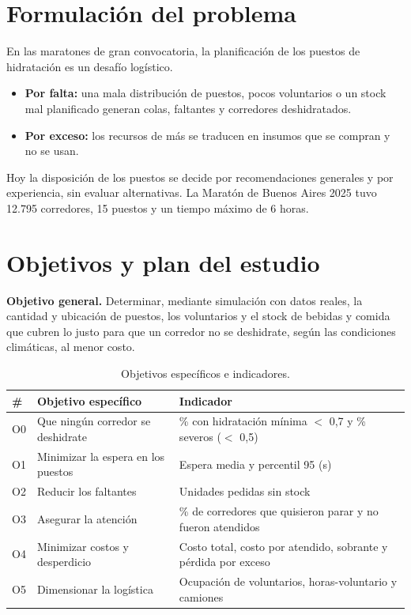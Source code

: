 \documentclass[11pt,a4paper]{article}
\begin{document}
\tableofcontents
\newpage

\section{Formulación del problema}

En las maratones de gran convocatoria, la planificación de los puestos de hidratación es un desafío logístico.
\begin{itemize}
    \item \textbf{Por falta:} una mala distribución de puestos, pocos voluntarios o un stock mal planificado generan colas, faltantes y corredores deshidratados.
    \item \textbf{Por exceso:} los recursos de más se traducen en insumos que se compran y no se usan.
\end{itemize}
Hoy la disposición de los puestos se decide por recomendaciones generales y por experiencia, sin evaluar alternativas. La Maratón de Buenos Aires 2025 tuvo 12.795 corredores, 15 puestos y un tiempo máximo de 6 horas.

\section{Objetivos y plan del estudio}

\textbf{Objetivo general.} Determinar, mediante simulación con datos reales, la cantidad y ubicación de puestos, los voluntarios y el stock de bebidas y comida que cubren lo justo para que un corredor no se deshidrate, según las condiciones climáticas, al menor costo.

\begin{table}[H]
\centering
\small
\begin{tabular}{lP{6cm}P{6.5cm}}
\toprule
\textbf{\#} & \textbf{Objetivo específico} & \textbf{Indicador} \\
\midrule
O0 & Que ningún corredor se deshidrate & \% con hidratación mínima $<$ 0,7 y \% severos ($<$ 0,5) \\
O1 & Minimizar la espera en los puestos & Espera media y percentil 95 (s) \\
O2 & Reducir los faltantes & Unidades pedidas sin stock \\
O3 & Asegurar la atención & \% de corredores que quisieron parar y no fueron atendidos \\
O4 & Minimizar costos y desperdicio & Costo total, costo por atendido, sobrante y pérdida por exceso \\
O5 & Dimensionar la logística & Ocupación de voluntarios, horas-voluntario y camiones \\
\bottomrule
\end{tabular}
\caption{Objetivos específicos e indicadores.}
\end{table}
\end{document}
